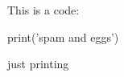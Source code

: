 \documentclass[MWE-1.tex]{subfiles}
\begin{document}
This is a code:
\begin{pyverbatim}
print('spam and eggs')
\end{pyverbatim}

 just printing 
\end{document}
